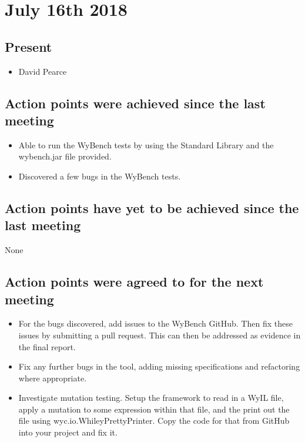 \documentclass[]{article}
\begin{document}
\section{July 16th 2018}
\subsection{Present}
\begin{itemize}
	\item David Pearce
\end{itemize}

\subsection{Action points were achieved since the last meeting}
\begin{itemize}
	\item Able to run the WyBench tests by using the Standard Library and the wybench.jar file provided.
	\item Discovered a few bugs in the WyBench tests.
\end{itemize}
\subsection{Action points have yet to be achieved since the last meeting}
None
\subsection{Action points were agreed to for the next meeting}
\begin{itemize}
	\item For the bugs discovered, add issues to the WyBench GitHub. Then fix these issues by submitting a pull request. This can then be addressed as evidence in the final report.
	\item Fix any further bugs in the tool, adding missing
	specifications and refactoring where appropriate.
	\item Investigate mutation testing. Setup the framework to read in a WyIL file, apply a mutation to some expression within that file, and the print out the file using
	wyc.io.WhileyPrettyPrinter. Copy the code for that from GitHub into your project and fix it.
\end{itemize}
\end{document}
